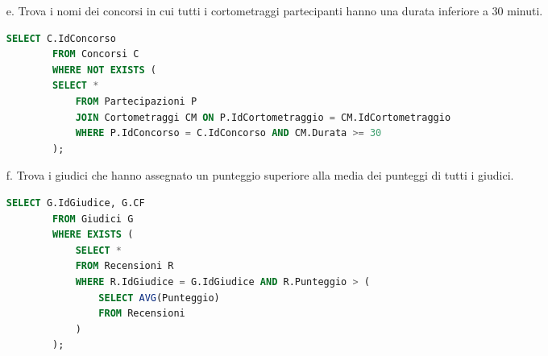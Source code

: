 \begin{enumerate}
\begin{lstlisting}[language=SQL]
		);
	\end{lstlisting} 
	\item[e.] Trova i nomi dei concorsi in cui tutti i cortometraggi partecipanti hanno una durata inferiore a 30 minuti.
	\begin{lstlisting}[language=SQL]
		SELECT C.IdConcorso
		FROM Concorsi C
		WHERE NOT EXISTS (
		SELECT *
			FROM Partecipazioni P
			JOIN Cortometraggi CM ON P.IdCortometraggio = CM.IdCortometraggio
			WHERE P.IdConcorso = C.IdConcorso AND CM.Durata >= 30
		);
	\end{lstlisting}
	\newpage
	\item[f.] Trova i giudici che hanno assegnato un punteggio superiore alla media dei punteggi di tutti i giudici.
	\begin{lstlisting}[language=SQL]
		SELECT G.IdGiudice, G.CF
		FROM Giudici G
		WHERE EXISTS (
			SELECT *
			FROM Recensioni R
			WHERE R.IdGiudice = G.IdGiudice AND R.Punteggio > (
				SELECT AVG(Punteggio) 
				FROM Recensioni
			)
		);
	\end{lstlisting} 
\end{enumerate}

\newpage

